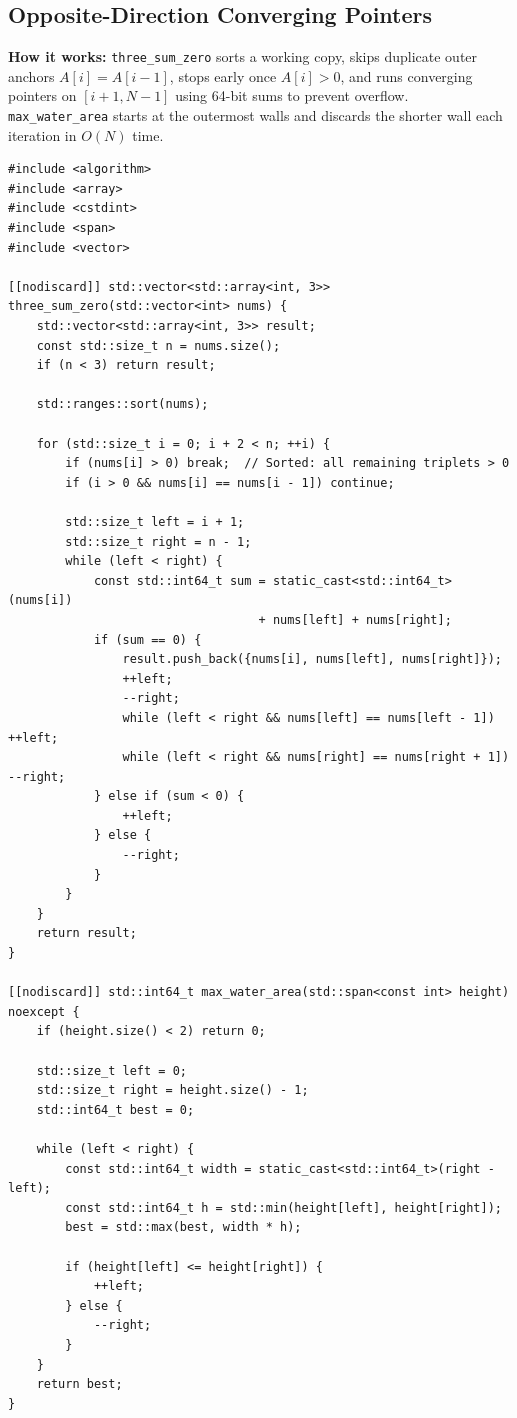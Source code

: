 \documentclass[11pt,a4paper]{article}
\theoremstyle{definition}
\begin{document}
\subsection{Opposite-Direction Converging Pointers}

\textbf{How it works:} \texttt{three\_sum\_zero} sorts a working copy, skips duplicate outer anchors $A[i] = A[i - 1]$, stops early once $A[i] > 0$, and runs converging pointers on $[i+1, N-1]$ using 64-bit sums to prevent overflow. \texttt{max\_water\_area} starts at the outermost walls and discards the shorter wall each iteration in $O(N)$ time.

\begin{lstlisting}[caption={Three-Sum (with duplicate skipping) and Container With Most Water.}]
#include <algorithm>
#include <array>
#include <cstdint>
#include <span>
#include <vector>

[[nodiscard]] std::vector<std::array<int, 3>>
three_sum_zero(std::vector<int> nums) {
    std::vector<std::array<int, 3>> result;
    const std::size_t n = nums.size();
    if (n < 3) return result;

    std::ranges::sort(nums);

    for (std::size_t i = 0; i + 2 < n; ++i) {
        if (nums[i] > 0) break;  // Sorted: all remaining triplets > 0
        if (i > 0 && nums[i] == nums[i - 1]) continue;

        std::size_t left = i + 1;
        std::size_t right = n - 1;
        while (left < right) {
            const std::int64_t sum = static_cast<std::int64_t>(nums[i])
                                   + nums[left] + nums[right];
            if (sum == 0) {
                result.push_back({nums[i], nums[left], nums[right]});
                ++left;
                --right;
                while (left < right && nums[left] == nums[left - 1]) ++left;
                while (left < right && nums[right] == nums[right + 1]) --right;
            } else if (sum < 0) {
                ++left;
            } else {
                --right;
            }
        }
    }
    return result;
}

[[nodiscard]] std::int64_t max_water_area(std::span<const int> height) noexcept {
    if (height.size() < 2) return 0;

    std::size_t left = 0;
    std::size_t right = height.size() - 1;
    std::int64_t best = 0;

    while (left < right) {
        const std::int64_t width = static_cast<std::int64_t>(right - left);
        const std::int64_t h = std::min(height[left], height[right]);
        best = std::max(best, width * h);

        if (height[left] <= height[right]) {
            ++left;
        } else {
            --right;
        }
    }
    return best;
}
\end{lstlisting}
\end{document}
